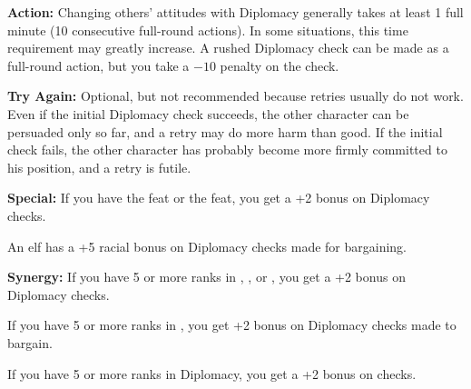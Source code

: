 \textbf{Action:} Changing others' attitudes with Diplomacy generally takes at least 1 full minute (10 consecutive full-round actions). In some situations, this time requirement may greatly increase. A rushed Diplomacy check can be made as a full-round action, but you take a $-10$ penalty on the check.

\textbf{Try Again:} Optional, but not recommended because retries usually do not work. Even if the initial Diplomacy check succeeds, the other character can be persuaded only so far, and a retry may do more harm than good. If the initial check fails, the other character has probably become more firmly committed to his position, and a retry is futile.

\textbf{Special:} If you have the  feat or the  feat, you get a +2 bonus on Diplomacy checks.

An elf has a +5 racial bonus on Diplomacy checks made for bargaining.

\textbf{Synergy:} If you have 5 or more ranks in , , or , you get a +2 bonus on Diplomacy checks.

If you have 5 or more ranks in , you get +2 bonus on Diplomacy checks made to bargain.

If you have 5 or more ranks in Diplomacy, you get a +2 bonus on  checks.
